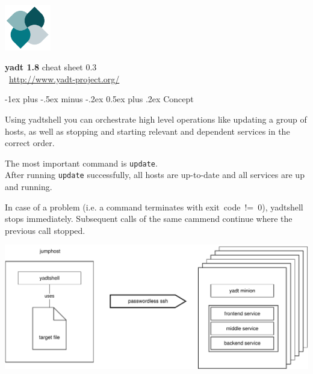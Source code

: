 \documentclass[10pt,landscape]{article}
\makeatletter
\renewcommand{\section}{\@startsection{section}{1}{0mm}%
                                {-1ex plus -.5ex minus -.2ex}%
                                {0.5ex plus .2ex}%
                                {\normalfont\large\bfseries}}
\newcommand{\note}[2][Note]{
\begin{description}[font=\bfseries,leftmargin=1cm,style=sameline]
    \item [{#1}] {#2}
\end{description}
}
\makeatother
\begin{document}
\raggedright
\footnotesize
\begin{multicols}{3}
\raggedcolumns


\setlength{\premulticols}{1pt}
\setlength{\postmulticols}{1pt}
\setlength{\multicolsep}{1em}
\setlength{\columnsep}{1em}

\includegraphics[width=2cm,valign=t]{res/yadtlogo}%
\hfill%
\begin{minipage}[t]{5cm}
{\Large{\textbf{yadt 1.8}}}\hfill
\textcolor{faded}{cheat sheet 0.3}\\[1em]
~\hfill\href{http://www.yadt-project.org/}{http://www.yadt-project.org/}
\end{minipage}


\section{Concept}

Using yadtshell you can orchestrate high level operations like updating
a group of hosts, as well as stopping and starting relevant and dependent
services in the correct order.
\medskip

The most important command is \verb+update+.\\
After running \verb+update+ successfully, all hosts are up-to-date and
all services are up and running.

\note{In case of a problem (i.e. a command terminates with exit~code~!=~0),
yadtshell stops immediately. Subsequent calls of the same cammend continue
where the previous call stopped.}

\includegraphics[width=\linewidth]{res/concept}


\end{multicols}
\end{document}

